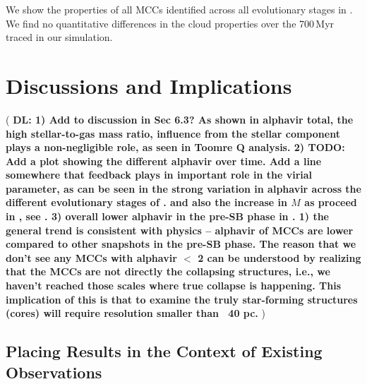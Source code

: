 \IfFileExists{emulateapjlegacy.cls}{\documentclass[iop]{emulateapjlegacy}}{\documentclass[iop]{emulateapj}}
\newcommand{\DL}[1]{({\bf \color{dlcolor} DL: #1})}
\begin{document}
We show the properties of all MCCs identified across all evolutionary stages in . 
We find no quantitative differences in the cloud properties over the 700\,Myr traced in our simulation. 



\section{Discussions and Implications}\label{sec:diss}

\DL{
1) Add to discussion in Sec 6.3? As shown in alphavir total, the high stellar-to-gas mass ratio, 
influence from the stellar component plays a non-negligible role, as seen in Toomre Q analysis.
% 
2) TODO: Add a plot showing the different alphavir over time. Add a line somewhere that feedback plays in important role in the virial parameter, as 
can be seen in the strong variation in alphavir across the different evolutionary stages of \flower. 
and also the increase in $M$ as \SF proceed in \flower, see \Fig{Mach_stellarRatio}.
% 
3) overall lower alphavir in the pre-SB phase in \Fig{alphaEvol}. 
1) the general trend is consistent with physics -- alphavir of MCCs are lower compared to other snapshots in the pre-SB phase.  
The reason that we don’t see any MCCs with alphavir $<$ 2 can be understood by realizing that the MCCs are not 
directly the collapsing structures, i.e., we haven’t reached those scales where true collapse is happening.
This implication of this is that to examine the truly star-forming structures (cores) will require resolution smaller than ~40 pc.
}

\subsection{Placing Results in the Context of Existing Observations} \label{sec:diss1}
\end{document}
